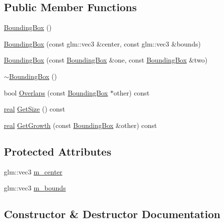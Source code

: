 \subsection*{Public Member Functions}
\begin{DoxyCompactItemize}
\item 
\hyperlink{classrum_1_1_bounding_box_ab8fc622a27065c0bfe9e9f3d057c900e}{Bounding\+Box} ()
\item 
\hyperlink{classrum_1_1_bounding_box_a60123b8bafc7fa4ef78cdf2a4c49eac3}{Bounding\+Box} (const glm\+::vec3 \&center, const glm\+::vec3 \&bounds)
\item 
\hyperlink{classrum_1_1_bounding_box_a68f722c0cc72e5c939fa1fa382b26330}{Bounding\+Box} (const \hyperlink{classrum_1_1_bounding_box}{Bounding\+Box} \&one, const \hyperlink{classrum_1_1_bounding_box}{Bounding\+Box} \&two)
\item 
\hyperlink{classrum_1_1_bounding_box_a515a617dd779ad1932598f0bb6bd9669}{$\sim$\+Bounding\+Box} ()
\item 
bool \hyperlink{classrum_1_1_bounding_box_af7d2034adecd49f949b7bf5bfa942498}{Overlaps} (const \hyperlink{classrum_1_1_bounding_box}{Bounding\+Box} $\ast$other) const
\item 
\hyperlink{namespacerum_a7e8cca23573d5eaead0f138cbaa4862c}{real} \hyperlink{classrum_1_1_bounding_box_add513abe94c5ad77ff3ec2f29b6d6241}{Get\+Size} () const
\item 
\hyperlink{namespacerum_a7e8cca23573d5eaead0f138cbaa4862c}{real} \hyperlink{classrum_1_1_bounding_box_a944672fb8a07383cf4409393a62ffc1f}{Get\+Growth} (const \hyperlink{classrum_1_1_bounding_box}{Bounding\+Box} \&other) const
\end{DoxyCompactItemize}
\subsection*{Protected Attributes}
\begin{DoxyCompactItemize}
\item 
glm\+::vec3 \hyperlink{classrum_1_1_bounding_box_af9c7a5df5b02f646a1aa0d5cf0c4e1fd}{m\+\_\+center}
\item 
glm\+::vec3 \hyperlink{classrum_1_1_bounding_box_a676df9315a0bf21962b02c65cb765a3a}{m\+\_\+bounds}
\end{DoxyCompactItemize}


\subsection{Constructor \& Destructor Documentation}
\mbox{\label{classrum_1_1_bounding_box_ab8fc622a27065c0bfe9e9f3d057c900e}} 
